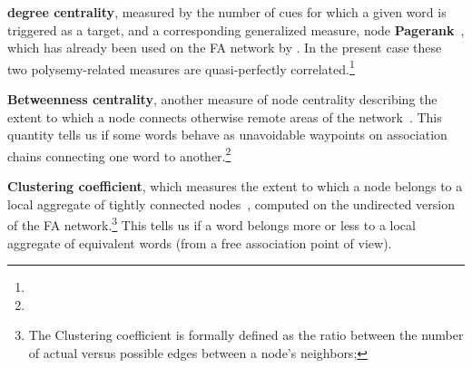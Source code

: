 \begin{APAitemize}

    \item \textbf{ degree centrality}, measured by the number of cues for which a given word is triggered as a target, and a corresponding generalized measure, node \textbf{Pagerank}~\citep{page_pagerank_1999}, which has already been used on the FA network by \citet{griffiths_google_2007}.
    In the present case these two polysemy-related measures are quasi-perfectly correlated.\footnote{
    }

    \item \textbf{Betweenness centrality}, another measure of node centrality describing the extent to which a node connects otherwise remote areas of the network~\citep{freeman_set_1977}.
    This quantity tells us if some words behave as unavoidable waypoints on association chains connecting one word to another.\footnote{
    }

    \item \textbf{Clustering coefficient}, which measures the extent to which a node belongs to a local aggregate of tightly connected nodes~\citep{watts_collective_1998}, computed on the undirected  version of the FA network.\footnote{The Clustering coefficient is formally defined as the ratio between the number of actual versus possible edges between a node's neighbors;
    }
    This tells us if a word belongs more or less to a local aggregate of equivalent words (from a free association point of view).

\end{APAitemize}

